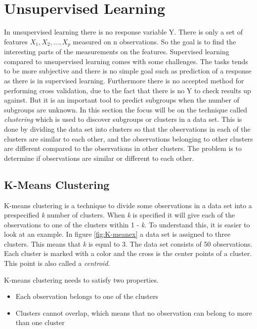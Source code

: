\chapter{Unsupervised Learning}
\label{chp:unsuplea}
In unsupervised learning there is no response variable Y. There is only a set of features $X_1, X_2,..., X_p$ measured on n observations. So the goal is to find the interesting parts of the measurements on the features.
Supervised learning compared to unsupervised learning comes with some challenges. The tasks tends to be more subjective and there is no simple goal such as prediction of a response as there is in supervised learning. Furthermore there is no accepted method for performing cross validation, due to the fact that there is no Y to check results up against.
But it is an important tool to predict subgroups when the number of subgroups are unknown.
In this section the focus will be on the  technique called \emph{clustering} which is used to discover subgroups or clusters in a data set. 
This is done by dividing the data set into clusters so that the observations in each of the clusters are similar to each other, and the observations belonging to other clusters are different compared to the observations in other clusters.
The problem is to determine if observations are similar or different to each other.
 
\section{K-Means Clustering}
\label{chp:clus}
K-means clustering is a technique to divide some observations in a data set into a prespecified \emph{k} number of clusters. When \emph{k} is specified it will give each of the observations to one of the clusters within 1 - \emph{k}. To understand this, it is easier to look at an example. In figure \ref{fig:K-meanex} a data set is assigned to three clusters. This means that \emph{k} is equal to 3. The data set consists of 50 observations. Each cluster is marked with a color and the cross is the center points of a cluster. This point is also called a \emph{centroid}.


K-means clustering needs to satisfy two properties. 
\begin{itemize}
	\item Each observation belongs to one of the clusters
	\item Clusters cannot overlap, which means that no observation can belong to more than one cluster
\end{itemize} 

